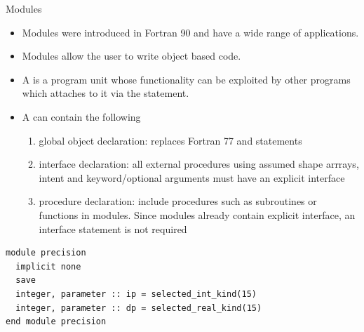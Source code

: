 \documentclass[10pt,t]{beamer}
\begin{document}
\begin{frame}{Modules}
  \begin{itemize}
    \item Modules were introduced in Fortran 90 and have a wide range of applications.
    \item Modules allow the user to write object based code.
    \item A  is a program unit whose functionality can be exploited by other programs which attaches to it via the  statement.
    \item A  can contain the following
    \begin{enumerate}
      \item global object declaration: replaces Fortran 77  and  statements
      \item interface declaration: all external procedures using assumed shape arrrays, intent and keyword/optional arguments must have an explicit interface
      \item procedure declaration: include procedures such as subroutines or functions in modules. Since modules already contain explicit interface, an interface statement is not required
    \end{enumerate}
  \end{itemize}
  \framebreak
  \begin{lstlisting}[language={[90]Fortran},basicstyle=\fontsize{4}{5}\selectfont\ttfamily,multicols=2]
module precision
  implicit none
  save
  integer, parameter :: ip = selected_int_kind(15)
  integer, parameter :: dp = selected_real_kind(15)
end module precision


\end{lstlisting}
\end{frame}
\end{document}
